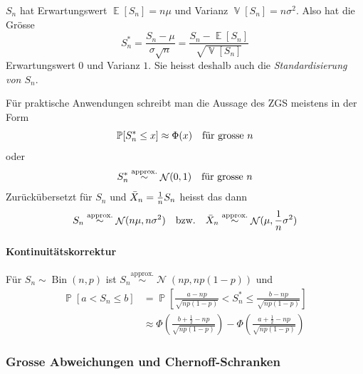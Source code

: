\documentclass[a4paper,10pt]{article}
\renewcommand{\P}{\operatorname{\mathbb{P}}}
\DeclareMathOperator{\E}{\mathbb{E}}
\DeclareMathOperator{\V}{\mathbb{V}}
\DeclareMathOperator{\Bin}{Bin}
\DeclareMathOperator{\normal}{\mathcal{N}}
\numberwithin{equation}{section}
\begin{document}
\( S_n \) hat Erwartungswert \( \E[S_n] = n \mu \) und Varianz \( \V[S_n] = n \sigma^2 \). Also hat die Grösse
\[
    S_n^* = \frac{S_n - \mu}{\sigma \sqrt{n}} = \frac{S_n - \E[S_n]}{\sqrt{\V[S_n]}}
\]
Erwartungswert \( 0 \) und Varianz \( 1 \). Sie heisst deshalb auch die \emph{Standardisierung von \( S_n \)}.

Für praktische Anwendungen schreibt man die Aussage des ZGS meistens in der Form
\[
    \P[S_n^* \leq x] \approx \Phi(x) \quad \text{für grosse \( n \)}
\]
oder
\[
    S_n^* \stackrel{\text{approx.}}{\sim} \normal(0, 1) \quad \text{für grosse \( n \)}
\]
Zurückübersetzt für \( S_n \) und \( \Bar{X}_n = \frac{1}{n} S_n \) heisst das dann
\[
    S_n \stackrel{\text{approx.}}{\sim} \normal(n \mu, n \sigma^2) \quad \text{bzw.} \quad \Bar{X}_n \stackrel{\text{approx.}}{\sim} \normal(\mu, \frac{1}{n} \sigma^2)
\]

\paragraph{Kontinuitätskorrektur} Für \( S_n \sim \Bin(n, p) \) ist \( S_n \stackrel{\text{approx.}}{\sim} \normal(np, np(1 - p)) \) und
\begin{align*}
    \P[a < S_n \leq b] &= \P\left[ \frac{a - np}{\sqrt{np(1 - p)}} < S_n^* \leq \frac{b - np}{\sqrt{np(1 - p)}} \right] \\
    &\approx \Phi\left( \frac{b + \frac{1}{2} - np}{\sqrt{np(1 - p)}} \right) - \Phi\left( \frac{a + \frac{1}{2} - np}{\sqrt{np(1 - p)}} \right)
\end{align*}

\subsubsection{Grosse Abweichungen und Chernoff-Schranken}

\end{document}
